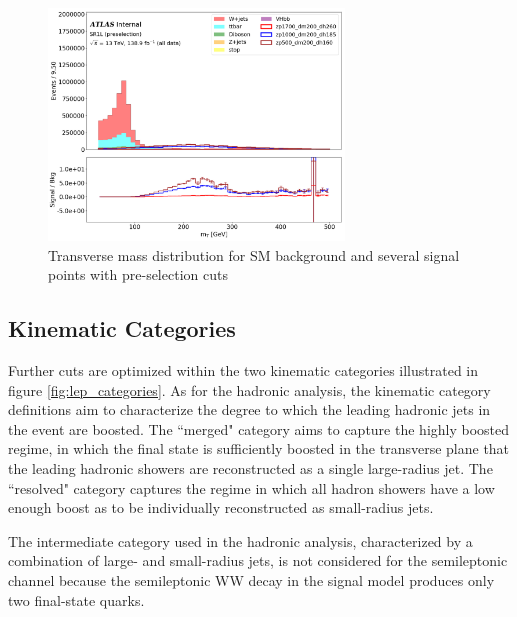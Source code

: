 \documentclass[12pt]{article}
\begin{document}
\begin{figure}[H]
	\centering
	\includegraphics[width=0.7\textwidth]{figures/mT_lep_met_preselection.png}
	\caption[]{Transverse mass distribution for SM background and several signal points with pre-selection cuts}
	\label{fig:mT_lep_met}
\end{figure}

\subsection{Kinematic Categories}

Further cuts are optimized within the two kinematic categories illustrated in figure \ref{fig:lep_categories}. As for the hadronic analysis, the kinematic category definitions aim to characterize the degree to which the leading hadronic jets in the event are boosted. The ``merged" category aims to capture the highly boosted regime, in which the final state is sufficiently boosted in the transverse plane that the leading hadronic showers are reconstructed as a single large-radius jet. The ``resolved" category captures the regime in which all hadron showers have a low enough boost as to be individually reconstructed as small-radius jets. 

The intermediate category used in the hadronic analysis, characterized by a combination of large- and small-radius jets, is not considered for the semileptonic channel because the semileptonic WW decay in the signal model produces only two final-state quarks. 
\end{document}
